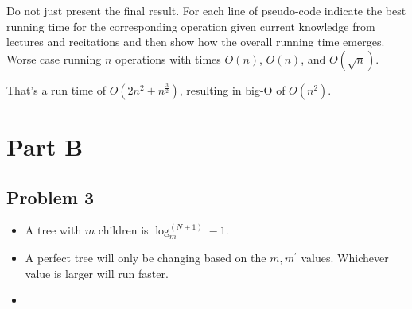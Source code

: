 \documentclass[11pt]{article}
\begin{document}
\noindent Do not just present the final result. For each line of
pseudo-code indicate the best running time for the corresponding
operation given current knowledge from lectures and recitations and
then show how the overall running time emerges.\\


Worse case running $n$ operations with times $O(n)$, $O(n)$, and $O(\sqrt{n})$.

That's a run time of $O(2 n^2 + n^{\frac{3}{2}})$, resulting in big-O of $O(n^2)$.

\section*{Part B}

\subsection*{Problem 3}
\begin{itemize}
\item A tree with $m$ children is $\log_m^(N+1)-1$.

\item A perfect tree will only be changing based on the $m,m^\prime$ values. Whichever value is larger will run faster.

\item
\end{itemize}
\end{document}
